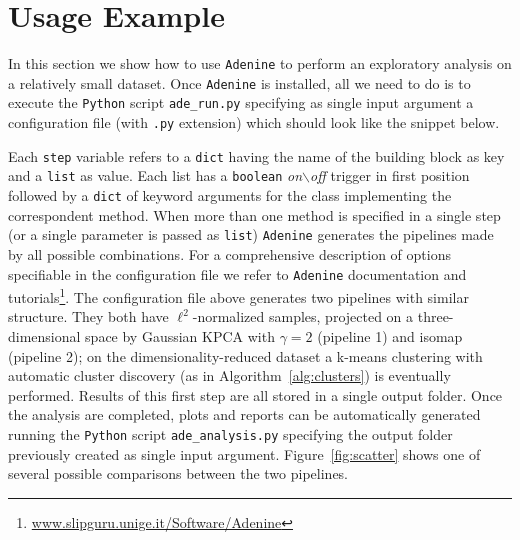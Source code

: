 \documentclass[twoside,11pt]{article}
\makeatletter
\newcommand{\ade}{\texttt{Adenine}\@\xspace}
\newcommand{\py}{\texttt{Python}\@\xspace}
\makeatother
\begin{document}
\section{Usage Example}
In this section we show how to use \ade to perform an exploratory analysis on a relatively small dataset. Once \ade is installed, all we need to do is to execute the \py script \texttt{ade\_run.py} specifying as single input argument a configuration file (with \texttt{.py} extension) which should look like the snippet below.
 


\noindent Each \texttt{step} variable refers to a \texttt{dict} having the name of the building block as key and a \texttt{list} as value. Each list has a \texttt{boolean} \emph{on$\backslash$off} trigger in first position followed by a \texttt{dict} of keyword arguments for the class implementing the correspondent method. When more than one method is specified in a single step (or a single parameter is passed as \texttt{list}) \ade generates the pipelines made by all possible combinations. 
For a comprehensive description of options specifiable in the configuration file we refer to \ade documentation and tutorials\footnote{\url{www.slipguru.unige.it/Software/Adenine}}.
The configuration file above generates two pipelines with similar structure. They both have $\ell^2$-normalized samples, projected on a three-dimensional space by Gaussian KPCA with $\gamma=2$ (pipeline 1) and isomap (pipeline 2); on the dimensionality-reduced dataset a k-means clustering with automatic cluster discovery (as in Algorithm~\ref{alg:clusters}) is eventually performed.
Results of this first step are all stored in a single output folder. Once the analysis are completed, plots and reports can be automatically generated running the \py script \texttt{ade\_analysis.py} specifying the output folder previously created as single input argument. Figure~\ref{fig:scatter} shows one of several possible comparisons between the two pipelines.
\end{document}

